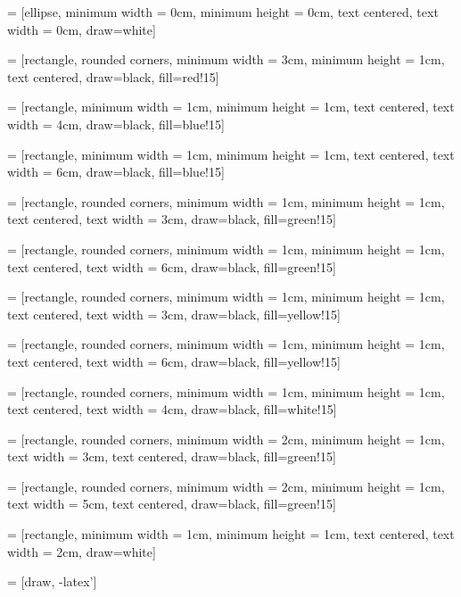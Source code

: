 \RequirePackage{tikz}



 =
[ellipse, minimum width = 0cm, minimum height = 0cm, text centered,
text width = 0cm, draw=white]

 =
[rectangle, rounded corners, minimum width = 3cm, minimum height = 1cm,
text centered, draw=black, fill=red!15]

 =
[rectangle, minimum width = 1cm, minimum height = 1cm, text centered, 
text width = 4cm, draw=black, fill=blue!15]

 =
[rectangle, minimum width = 1cm, minimum height = 1cm, text centered, 
text width = 6cm, draw=black, fill=blue!15]

 =
[rectangle, rounded corners, minimum width = 1cm, minimum height = 1cm,
text centered, text width = 3cm, draw=black, fill=green!15]

 =
[rectangle, rounded corners, minimum width = 1cm, minimum height = 1cm,
text centered, text width = 6cm, draw=black, fill=green!15]

 =
[rectangle, rounded corners, minimum width = 1cm, minimum height = 1cm,
text centered, text width = 3cm, draw=black, fill=yellow!15]

 =
[rectangle, rounded corners, minimum width = 1cm, minimum height = 1cm, 
text centered, text width = 6cm, draw=black, fill=yellow!15]

 =
[rectangle, rounded corners, minimum width = 1cm, minimum height = 1cm, 
text centered, text width = 4cm, draw=black, fill=white!15]

 = 
[rectangle, rounded corners, minimum width = 2cm, minimum height = 1cm, 
text width = 3cm, text centered, draw=black, fill=green!15]

 = 
[rectangle, rounded corners, minimum width = 2cm, minimum height = 1cm, 
text width = 5cm, text centered, draw=black, fill=green!15]

 = 
[rectangle, minimum width = 1cm, minimum height = 1cm, text centered, 
text width = 2cm, draw=white]

 = [draw, -latex']



\newcommand{\twrite}[1]{$\mathtt{#1}$}

\newcommand{\figref}[1]{Abbildung [\ref{#1}]}

